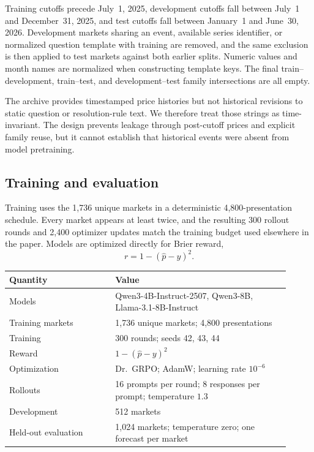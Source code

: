 Training cutoffs precede July~1, 2025, development cutoffs fall between July~1 and December~31, 2025, and test cutoffs fall between January~1 and June~30, 2026.
Development markets sharing an event, available series identifier, or normalized question template with training are removed, and the same exclusion is then applied to test markets against both earlier splits.
Numeric values and month names are normalized when constructing template keys.
The final train--development, train--test, and development--test family intersections are all empty.

The archive provides timestamped price histories but not historical revisions to static question or resolution-rule text.
We therefore treat those strings as time-invariant.
The design prevents leakage through post-cutoff prices and explicit family reuse, but it cannot establish that historical events were absent from model pretraining.

\subsection{Training and evaluation}

Training uses the 1,736 unique markets in a deterministic 4,800-presentation schedule.
Every market appears at least twice, and the resulting 300 rollout rounds and 2,400 optimizer updates match the training budget used elsewhere in the paper.
Models are optimized directly for Brier reward,
\[
r=1-(\widehat p-y)^2.
\]

\begin{center}
\begin{minipage}{0.88\linewidth}
\centering
{}
\label{tab:exp3b-hparams}
\small
\begin{tabular}{p{0.34\linewidth}p{0.57\linewidth}}
\toprule
Quantity & Value \\
\midrule
Models & Qwen3-4B-Instruct-2507, Qwen3-8B, Llama-3.1-8B-Instruct \\
Training markets & 1,736 unique markets; 4,800 presentations \\
Training & 300 rounds; seeds 42, 43, 44 \\
Reward & \(1-(\widehat p-y)^2\) \\
Optimization & Dr.~GRPO; AdamW; learning rate \(10^{-6}\) \\
Rollouts & 16 prompts per round; 8 responses per prompt; temperature \(1.3\) \\
Development & 512 markets \\
Held-out evaluation & 1,024 markets; temperature zero; one forecast per market \\
\bottomrule
\end{tabular}
\end{minipage}
\end{center}


